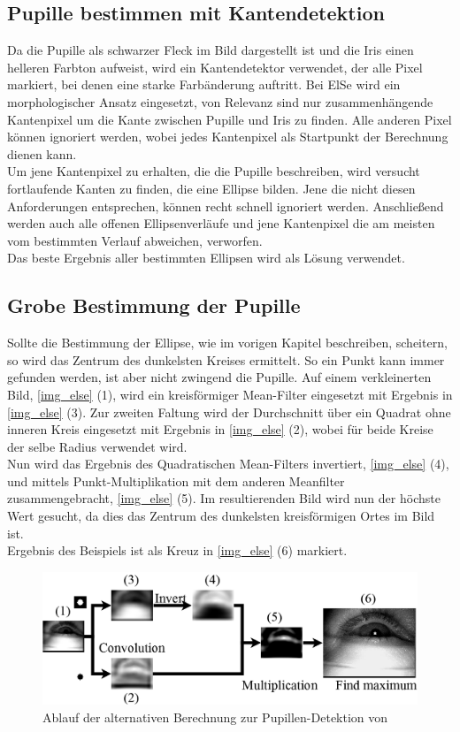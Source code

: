 \subsection{Pupille bestimmen mit Kantendetektion}
Da die Pupille als schwarzer Fleck im Bild dargestellt ist und die Iris einen helleren Farbton aufweist, wird ein Kantendetektor verwendet, der alle Pixel markiert, bei denen eine starke Farbänderung auftritt. Bei ElSe wird ein morphologischer Ansatz eingesetzt, von Relevanz sind nur zusammenhängende Kantenpixel um die Kante zwischen Pupille und Iris zu finden. Alle anderen Pixel können ignoriert werden, wobei jedes Kantenpixel als Startpunkt der Berechnung dienen kann.\\
Um jene Kantenpixel zu erhalten, die die Pupille beschreiben, wird versucht fortlaufende Kanten zu finden, die eine Ellipse bilden. Jene die nicht diesen Anforderungen entsprechen, können recht schnell ignoriert werden. Anschließend werden auch alle offenen Ellipsenverläufe und jene Kantenpixel die am meisten vom bestimmten Verlauf abweichen, verworfen.\\
Das beste Ergebnis aller bestimmten Ellipsen wird als Lösung verwendet.
\subsection{Grobe Bestimmung der Pupille}
\label{ElSe_Grob}
Sollte die Bestimmung der Ellipse, wie im vorigen Kapitel beschreiben, scheitern, so wird das Zentrum des dunkelsten Kreises ermittelt. So ein Punkt kann immer gefunden werden, ist aber nicht zwingend die Pupille.
\newpage
Auf einem verkleinerten Bild, \autoref{img_else} (1), wird ein kreisförmiger Mean-Filter eingesetzt mit Ergebnis in \autoref{img_else} (3). Zur zweiten Faltung wird der Durchschnitt über ein Quadrat ohne inneren Kreis eingesetzt mit Ergebnis in \autoref{img_else} (2), wobei für beide Kreise der selbe Radius verwendet wird.\\
Nun wird das Ergebnis des Quadratischen Mean-Filters invertiert, \autoref{img_else} (4), und mittels Punkt-Multiplikation mit dem anderen Meanfilter zusammengebracht, \autoref{img_else} (5). Im resultierenden Bild wird nun der höchste Wert gesucht, da dies das Zentrum des dunkelsten kreisförmigen Ortes im Bild ist.\\
Ergebnis des Beispiels ist als Kreuz in \autoref{img_else} (6) markiert. 
\begin{figure}
	\centering
	\includegraphics[width=0.8\linewidth]{img/ElSe}
	\caption{Ablauf der alternativen Berechnung zur Pupillen-Detektion von \cite{ElSe}}
	\label{img_else}
\end{figure}